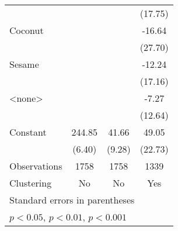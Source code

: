 {\begin{tabular}{l*{3}{c}}
                    &                     &                     &     (17.75)         \\
[1em]
Coconut             &                     &                     &      -16.64         \\
                    &                     &                     &     (27.70)         \\
[1em]
Sesame              &                     &                     &      -12.24         \\
                    &                     &                     &     (17.16)         \\
[1em]
<none>              &                     &                     &       -7.27         \\
                    &                     &                     &     (12.64)         \\
[1em]
Constant            &      244.85\sym{***}&       41.66\sym{***}&       49.05\sym{*}  \\
                    &      (6.40)         &      (9.28)         &     (22.73)         \\
\hline
Observations        &        1758         &        1758         &        1339         \\
Clustering          &          No         &          No         &         Yes         \\
\hline\hline
\multicolumn{4}{l}{\footnotesize Standard errors in parentheses}\\
\multicolumn{4}{l}{\footnotesize \sym{*} \(p<0.05\), \sym{**} \(p<0.01\), \sym{***} \(p<0.001\)}\\
\end{tabular}
}
